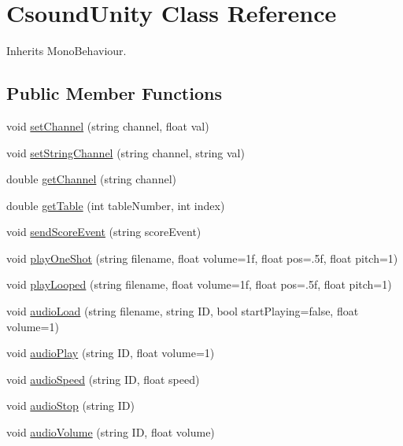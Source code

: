 \hypertarget{class_csound_unity}{}\section{Csound\+Unity Class Reference}
\label{class_csound_unity}


Inherits Mono\+Behaviour.

\subsection*{Public Member Functions}
\begin{DoxyCompactItemize}
\item 
void \hyperlink{class_csound_unity_afebc3022044ed76890504f9601e4ff12}{set\+Channel} (string channel, float val)
\item 
void \hyperlink{class_csound_unity_aae79884a11e16fecbe2cec0f4ba654ed}{set\+String\+Channel} (string channel, string val)
\item 
double \hyperlink{class_csound_unity_a3cfa402f674514c29185c920a0dd06c4}{get\+Channel} (string channel)
\item 
double \hyperlink{class_csound_unity_aa8172640715fda16afb2765896cb63d8}{get\+Table} (int table\+Number, int index)
\item 
void \hyperlink{class_csound_unity_a9dbf630b9ddb22f4ff3b2c7421a61f16}{send\+Score\+Event} (string score\+Event)
\item 
void \hyperlink{class_csound_unity_a3333c1b0ade93b6fa883cf367fafa694}{play\+One\+Shot} (string filename, float volume=1f, float pos=.\+5f, float pitch=1)
\item 
void \hyperlink{class_csound_unity_a5a4c2a7370fb91d2cff05920a279b977}{play\+Looped} (string filename, float volume=1f, float pos=.\+5f, float pitch=1)
\item 
void \hyperlink{class_csound_unity_a5c571bca9cfc3628f977a16c2d56a48f}{audio\+Load} (string filename, string I\+D, bool start\+Playing=false, float volume=1)
\item 
void \hyperlink{class_csound_unity_a64d2ae9a76b8a1561434c190f40ae59e}{audio\+Play} (string I\+D, float volume=1)
\item 
void \hyperlink{class_csound_unity_a8ec213294d8f20ef60a30f7394ab87a3}{audio\+Speed} (string I\+D, float speed)
\item 
void \hyperlink{class_csound_unity_aee52d0bf0fd0fe5bb82ed0d5023a336c}{audio\+Stop} (string I\+D)
\item 
void \hyperlink{class_csound_unity_a2ab26a0009e493cb72c940f4e637b442}{audio\+Volume} (string I\+D, float volume)

\end{DoxyCompactItemize}
